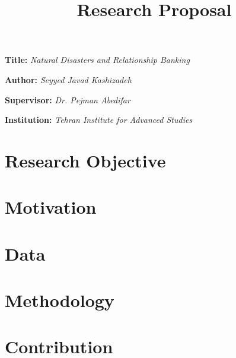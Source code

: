 \documentclass[12pt, a4paper]{article}
\title{\textbf{Research Proposal}}
\author{}
\date{}
\newcommand{\namelistlabel}[1]{\mbox{#1}\hfil}
\newenvironment{namelist}[1]{%
	\begin{list}{}
		{
			\let\makelabel\namelistlabel
			\settowidth{\labelwidth}{#1}
			\setlength{\leftmargin}{1.1\labelwidth}
		}
	}{%
\end{list}}
\begin{document}
\maketitle

\begin{namelist}{xxxxxxxxxxxx}
	\item[{\bf Title:}]
	\textit{Natural Disasters and Relationship Banking}
	\item[{\bf Author:}]
	\textit{	Seyyed Javad Kashizadeh}
	\item[{\bf Supervisor:}]
	\textit{	Dr. Pejman Abedifar}
	\item[{\bf Institution:}]
	\textit{	Tehran Institute for Advanced Studies}
\end{namelist}
\section*{Research Objective}

\section*{Motivation}

\section*{Data}

\section*{Methodology}

\section*{Contribution}







	{
	\footnotesize
	
	
}
\end{document}
